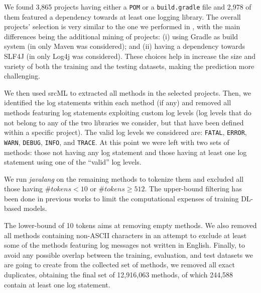 We found 3,865 projects having either a \texttt{POM} or a \texttt{build.gradle} file and 2,978 of them featured a dependency towards at least one logging library. The overall projects' selection is very similar to the one we performed in \cite{mastropaolo2022using}, with the main differences being the additional mining of projects: (i) using Gradle as build system (in \cite{mastropaolo2022using} only Maven was considered); and (ii) having a dependency towards SLF4J (in \cite{mastropaolo2022using} only Log4j was considered). These choices help in increase the size and variety of both the training and the testing datasets, making the prediction more challenging. 

We then used srcML \cite{srcml} to extracted all \java methods in the selected projects. Then, we identified the log statements within each method (if any) and removed all methods featuring log statements exploiting custom log levels (\ie log levels that do not belong to any of the two libraries we consider, but that have been defined within a specific project). The valid log levels we considered are: \texttt{FATAL}, \texttt{ERROR}, \texttt{WARN}, \texttt{DEBUG}, \texttt{INFO}, and \texttt{TRACE}. At this point we were left with two sets of methods: those not having any log statement and those having at least one log statement using one of the ``valid'' log levels.

We run \emph{javalang} \cite{javalang} on the remaining methods to tokenize them and excluded all those having $\#tokens < 10$ or $\#tokens \geq 512$. The upper-bound filtering has been done in previous works \cite{mastropaolo2021empirical,tufano2021automating,ciniselli2021empirical,tufano-mutants,Tufano:tosem2019} to limit the computational expenses of training DL-based models. 

The lower-bound of 10 tokens aims at removing empty methods. We also removed all methods containing non-ASCII characters in an attempt to exclude at least some of the methods featuring log messages not written in English. Finally, to avoid any possible overlap between the training, evaluation, and test datasets we are going to create from the collected set of methods, we removed all exact duplicates, obtaining the final set of 12,916,063 \java methods, of which 244,588 contain at least one log statement. 

